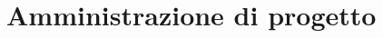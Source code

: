 \documentclass[../main]{subfiles}
\begin{document}
\section{Amministrazione di progetto}
\end{document}
